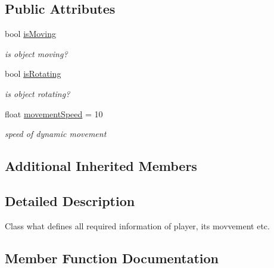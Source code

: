 \subsection*{Public Attributes}
\begin{DoxyCompactItemize}
\item 
\mbox{\label{class_player_ab7d15897ddde5fe3f7fc88d889ef5bcb}} 
bool \hyperlink{class_player_ab7d15897ddde5fe3f7fc88d889ef5bcb}{is\+Moving}
\begin{DoxyCompactList}\small\item\em is object moving? \end{DoxyCompactList}\item 
\mbox{\label{class_player_a3e38beabe05f4d43ab7338aaf355889b}} 
bool \hyperlink{class_player_a3e38beabe05f4d43ab7338aaf355889b}{is\+Rotating}
\begin{DoxyCompactList}\small\item\em is object rotating? \end{DoxyCompactList}\item 
\mbox{\label{class_player_aac9c0114d8784c5230fe910e0dc24f4b}} 
float \hyperlink{class_player_aac9c0114d8784c5230fe910e0dc24f4b}{movement\+Speed} = 10
\begin{DoxyCompactList}\small\item\em speed of dynamic movement \end{DoxyCompactList}\end{DoxyCompactItemize}
\subsection*{Additional Inherited Members}


\subsection{Detailed Description}
Class what defines all required information of player, its movvement etc. 

\subsection{Member Function Documentation}
\mbox{\label{class_player_a3fb29852d8ec3172353eba73529dd918}} 
